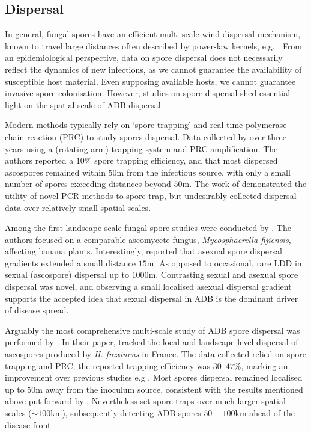 \newpage

\subsection{Dispersal}

In general, fungal spores have an efficient multi-scale wind-dispersal mechanism,
known to travel large distances \cite{golan2017long, wingen2013long, mundt2009aerial}
often described by power-law kernels, e.g. \cite{shaw2006assembling}.
From an epidemiological perspective, data on spore dispersal does not necessarily reflect the dynamics of new infections, 
as we cannot guarantee the availability of susceptible host material.
Even supposing available hosts, we cannot guarantee invasive spore colonisation.
However, studies on spore dispersal shed essential light on the spatial scale of ADB dispersal. 

Modern methods typically rely on `spore trapping' and real-time polymerase chain reaction (PRC) to study spores dispersal.
Data collected by \cite{chandelier2014detection} over three years using a (rotating arm) trapping system
and PRC amplification. The authors reported a $10\%$ spore trapping efficiency, and that most
dispersed ascospores remained within $50\mathrm{m}$ from the infectious source, with only a small number of spores exceeding 
distances beyond $50\mathrm{m}$. The work of \cite{chandelier2014detection} demonstrated the utility of novel PCR methods
to spore trap, but undesirably collected dispersal data over relatively small spatial scales.

Among the first landscape-scale fungal spore studies were conducted by \cite{long-range-dispersal}.
The authors focused on a comparable ascomycete fungus, \textit{Mycosphaerella fijiensis}, affecting banana plants.
Interestingly, \cite{long-range-dispersal} reported that asexual spore dispersal gradients extended 
a small distance $15\mathrm{m}$. As opposed to occasional, rare LDD in sexual (ascospore) dispersal up to $1000\mathrm{m}$.
Contrasting sexual and asexual spore dispersal was novel, and observing a small localised asexual dispersal gradient supports
the accepted idea that sexual dispersal in ADB is the dominant driver of disease spread.

Arguably the most comprehensive multi-scale study of ADB spore dispersal was performed by \cite{grosdidier2018tracking}.
In their paper, \cite{grosdidier2018tracking} tracked the local and landscape-level dispersal of ascospores
produced by \textit{H. fraxineus} in France.
The data collected relied on spore trapping and PRC; the reported trapping efficiency was $30–47\%$, marking an improvement over previous studies
e.g \cite{chandelier2014detection}. Most spores dispersal remained localised up to $50\mathrm{m}$ away from the inoculum source,
consistent with the results mentioned above put forward by \cite{chandelier2014detection}.
Nevertheless \cite{grosdidier2018tracking} set spore traps over much larger spatial scales ($\sim 100\mathrm{km}$),
subsequently detecting ADB spores $50-100\mathrm{km}$ ahead of the disease front.

